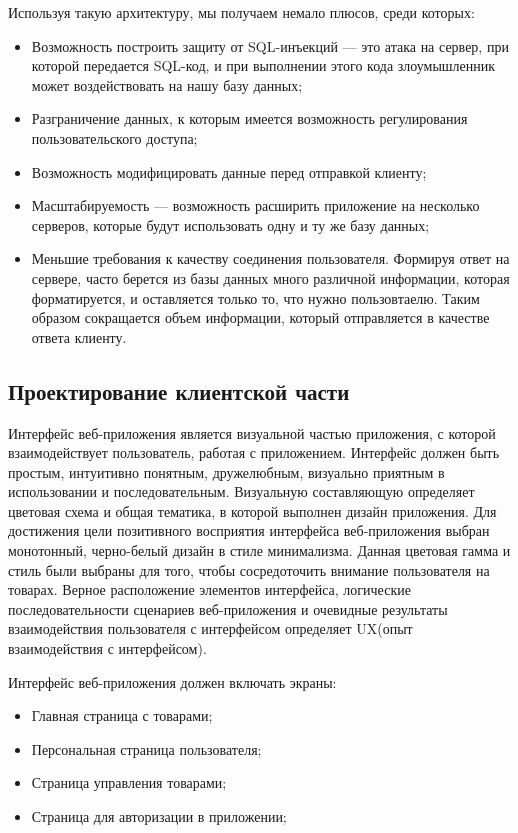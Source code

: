 Используя такую архитектуру, мы получаем немало плюсов, среди которых:
\begin{itemize}
    \item Возможность построить защиту от SQL-инъекций — это атака на сервер, при которой передается SQL-код, и при выполнении этого кода злоумышленник может воздействовать на нашу базу данных;
    \item Разграничение данных, к которым имеется возможность регулирования пользовательского доступа;
    \item Возможность модифицировать данные перед отправкой клиенту;
    \item Масштабируемость — возможность расширить приложение на несколько серверов, которые будут использовать одну и ту же базу данных;
    \item Меньшие требования к качеству соединения пользователя.
    Формируя ответ на сервере, часто берется из базы данных много различной информации, которая форматируется, и оставляется только то, что нужно пользовтаелю.
    Таким образом сокращается объем информации, который отправляется в качестве ответа клиенту.
\end{itemize}

\subsection{Проектирование клиентской части}
Интерфейс веб-приложения является визуальной частью приложения, с которой взаимодействует пользователь, работая с приложением.
Интерфейс должен быть простым, интуитивно понятным, дружелюбным, визуально приятным в использовании и последовательным. Визуальную составляющую определяет цветовая схема и общая тематика, в которой выполнен дизайн приложения.
Для достижения цели позитивного восприятия интерфейса веб-приложения выбран монотонный, черно-белый дизайн в стиле минимализма.
Данная цветовая гамма и стиль были выбраны для того, чтобы сосредоточить внимание пользователя на товарах.
Верное расположение элементов интерфейса, логические последовательности сценариев веб-приложения и очевидные результаты взаимодействия пользователя с интерфейсом определяет UX(опыт взаимодействия с интерфейсом).

Интерфейс веб-приложения должен включать экраны:
\begin{itemize}
    \item Главная страница с товарами;
    \item Персональная страница пользователя;
    \item Страница управления товарами;
    \item Страница для авторизации в приложении;
\end{itemize}

